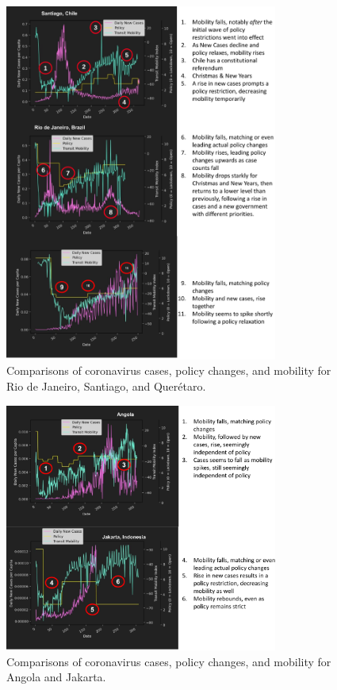 \clearpage

\begin{figure}[!htb]
\centering
\includegraphics[width=0.8\textwidth]{Figures/chap5/mobility-graphs-rio-santiago.png}
\caption[Mobility, COVID, \& policy in Rio de Janeiro, Santiago, and Querétaro]{Comparisons of coronavirus cases, policy changes, and mobility for Rio de Janeiro, Santiago, and Querétaro.}
\label{fig:mobility-graphs-rio-santiago}
\end{figure}

\begin{figure}[!htb]
\centering
\includegraphics[width=0.8\textwidth]{Figures/chap5/mobility-graphs-angola-jakarta.png}
\caption[Mobility, COVID, \& policy in Angola and Jakarta]{Comparisons of coronavirus cases, policy changes, and mobility for Angola and Jakarta.}
\label{fig:mobility-graphs-angola-jakarta}
\end{figure}

